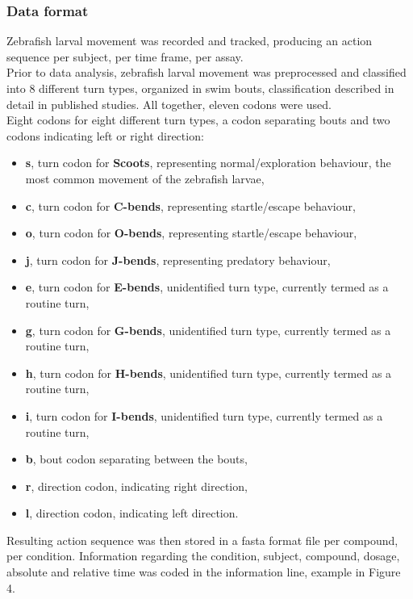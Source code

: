 \documentclass[a4paper,12pt]{article}
\begin{document}
\subsubsection{Data format}
Zebrafish larval movement was recorded and tracked, producing an action sequence per subject, per time frame, per assay. \\Prior to data analysis, zebrafish larval movement was preprocessed and classified into 8 different turn types, organized in swim bouts, classification described in detail in published studies\cite{ref18}. All together, eleven codons were used. \\Eight codons for eight different turn types, a codon separating bouts and two codons indicating left or right direction:
\begin{itemize}
\item \textbf{s}, turn codon for \textbf{Scoots}, representing normal/exploration behaviour, the most common movement of the zebrafish larvae,
\item \textbf{c}, turn codon for \textbf{C-bends}, representing startle/escape behaviour,
\item \textbf{o}, turn codon for \textbf{O-bends}, representing startle/escape behaviour, 
\item \textbf{j}, turn codon for \textbf{J-bends}, representing predatory behaviour,
\item \textbf{e}, turn codon for \textbf{E-bends}, unidentified turn type, currently termed as a routine turn,
\item \textbf{g}, turn codon for \textbf{G-bends}, unidentified turn type, currently termed as a routine turn, 
\item \textbf{h}, turn codon for \textbf{H-bends}, unidentified turn type, currently termed as a routine turn, 
\item \textbf{i}, turn codon for \textbf{I-bends}, unidentified turn type, currently termed as a routine turn,  
\item \textbf{b}, bout codon separating between the bouts,  
\item \textbf{r}, direction codon, indicating right direction,  
\item \textbf{l}, direction codon, indicating left direction. 
\end{itemize}
Resulting action sequence was then stored in a fasta format file per compound, per condition. Information regarding the condition, subject, compound, dosage, absolute and relative time was coded in the information line, example in Figure 4.
\end{document}
